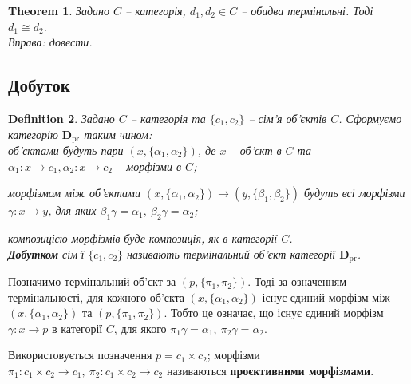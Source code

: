 \documentclass[a4paper, 10pt]{article}
\theoremstyle{theoremdd}
\newtheorem{theorem}{Theorem}[subsection]
\newtheorem{definition}[theorem]{Definition}
\begin{document}
\begin{theorem}
Задано $C$ -- категорія, $d_1,d_2 \in C$ -- обидва термінальні. Тоді $d_1 \cong d_2$.\\
\textit{Вправа: довести.}
\end{theorem}

\subsection{Добуток}
\begin{definition}
Задано $C$ -- категорія та $\{c_1,c_2\}$ -- сім'я об'єктів $C$. Сформуємо категорію $\textbf{D}_{\text{pr}}$ таким чином:\\
об'єктами будуть пари $(x,\{\alpha_1,\alpha_2\})$, де $x$ -- об'єкт в $C$ та $\alpha_1 \colon x \to c_1, \alpha_2 \colon x \to c_2$ -- морфізми в $C$;
\begin{figure}[H]
\centering
{}
\end{figure}
\noindent морфізмом між об'єктами $(x,\{\alpha_1,\alpha_2\}) \to (y,\{\beta_1,\beta_2\})$ будуть всі морфізми $\gamma \colon x \to y$, для яких $\beta_1 \gamma = \alpha_1,\ \beta_2 \gamma = \alpha_2$;
\begin{figure}[H]
\centering
{}
\end{figure}
\noindent композицією морфізмів буде композиція, як в категорії $C$.\\
\textbf{Добутком} сім'ї $\{c_1,c_2\}$ називають термінальний об'єкт категорії $\textbf{D}_{\text{pr}}$.
\end{definition}

\noindent Позначимо термінальний об'єкт за $(p,\{\pi_1,\pi_2\})$. Тоді за означенням термінальності, для кожного об'єкта $(x,\{\alpha_1,\alpha_2\})$ існує єдиний морфізм між $(x,\{\alpha_1,\alpha_2\})$ та $(p,\{\pi_1,\pi_2\})$. Тобто це означає, що існує єдиний морфізм $\gamma \colon x \to p$ в категорії $C$, для якого $\pi_1 \gamma = \alpha_1,\ \pi_2 \gamma = \alpha_2$.
\begin{figure}[H]
\centering
{}
\end{figure}
\noindent  Використовується позначення $p = c_1 \times c_2$; морфізми $\pi_1 \colon c_1 \times c_2 \to c_1,\ \pi_2 \colon c_1 \times c_2 \to c_2$ називаються \textbf{проєктивними морфізмами}.
\end{document}
